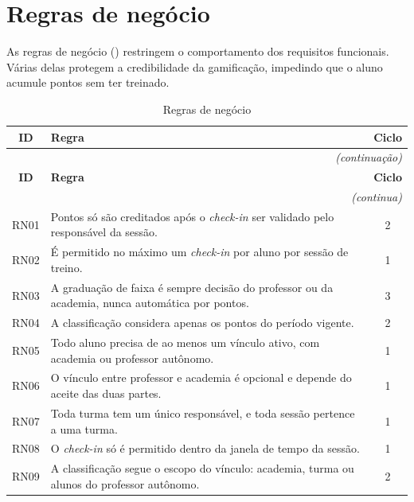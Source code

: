\section{Regras de negócio}
\label{sec:rn}

As regras de negócio () restringem o comportamento dos
requisitos funcionais. Várias delas protegem a credibilidade da
gamificação, impedindo que o aluno acumule pontos sem ter treinado.

\begin{quadrolongo}
\begin{longtable}{|c|p{11.6cm}|c|}
  \caption{Regras de negócio}\label{qua:rn}\\
  \hline
  \textbf{ID} & \textbf{Regra} & \textbf{Ciclo} \\ \hline
\endfirsthead
  \multicolumn{3}{r}{\textit{(continuação)}}\\
  \hline
  \textbf{ID} & \textbf{Regra} & \textbf{Ciclo} \\ \hline
\endhead
  \multicolumn{3}{r}{\textit{(continua)}}\\
\endfoot
\endlastfoot
    RN01 & Pontos só são creditados após o \textit{check-in} ser validado pelo responsável da sessão. & 2 \\ \hline
    RN02 & É permitido no máximo um \textit{check-in} por aluno por sessão de treino. & 1 \\ \hline
    RN03 & A graduação de faixa é sempre decisão do professor ou da academia, nunca automática por pontos. & 3 \\ \hline
    RN04 & A classificação considera apenas os pontos do período vigente. & 2 \\ \hline
    RN05 & Todo aluno precisa de ao menos um vínculo ativo, com academia ou professor autônomo. & 1 \\ \hline
    RN06 & O vínculo entre professor e academia é opcional e depende do aceite das duas partes. & 1 \\ \hline
    RN07 & Toda turma tem um único responsável, e toda sessão pertence a uma turma. & 1 \\ \hline
    RN08 & O \textit{check-in} só é permitido dentro da janela de tempo da sessão. & 1 \\ \hline
    RN09 & A classificação segue o escopo do vínculo: academia, turma ou alunos do professor autônomo. & 2 \\ \hline
\end{longtable}
\end{quadrolongo}

